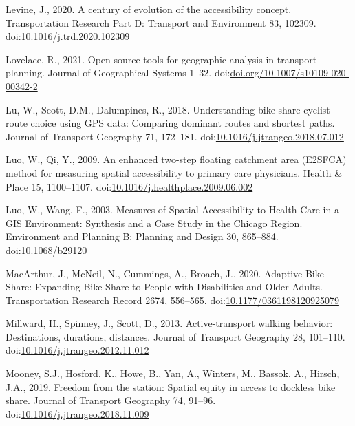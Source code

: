 \documentclass[]{elsarticle} %
\begin{document}
\leavevmode\hypertarget{ref-levineCenturyEvolutionAccessibility2020}{}%
Levine, J., 2020. A century of evolution of the accessibility concept.
Transportation Research Part D: Transport and Environment 83, 102309.
doi:\href{https://doi.org/10.1016/j.trd.2020.102309}{10.1016/j.trd.2020.102309}

\leavevmode\hypertarget{ref-lovelace2021open}{}%
Lovelace, R., 2021. Open source tools for geographic analysis in
transport planning. Journal of Geographical Systems 1--32.
doi:\href{https://doi.org/doi.org/10.1007/s10109-020-00342-2}{doi.org/10.1007/s10109-020-00342-2}

\leavevmode\hypertarget{ref-luUnderstandingBikeShare2018}{}%
Lu, W., Scott, D.M., Dalumpines, R., 2018. Understanding bike share
cyclist route choice using GPS data: Comparing dominant routes and
shortest paths. Journal of Transport Geography 71, 172--181.
doi:\href{https://doi.org/10.1016/j.jtrangeo.2018.07.012}{10.1016/j.jtrangeo.2018.07.012}

\leavevmode\hypertarget{ref-luoEnhancedTwostepFloating2009}{}%
Luo, W., Qi, Y., 2009. An enhanced two-step floating catchment area
(E2SFCA) method for measuring spatial accessibility to primary care
physicians. Health \& Place 15, 1100--1107.
doi:\href{https://doi.org/10.1016/j.healthplace.2009.06.002}{10.1016/j.healthplace.2009.06.002}

\leavevmode\hypertarget{ref-luoMeasuresSpatialAccessibility2003}{}%
Luo, W., Wang, F., 2003. Measures of Spatial Accessibility to Health
Care in a GIS Environment: Synthesis and a Case Study in the Chicago
Region. Environment and Planning B: Planning and Design 30, 865--884.
doi:\href{https://doi.org/10.1068/b29120}{10.1068/b29120}

\leavevmode\hypertarget{ref-macarthurAdaptiveBikeShare2020}{}%
MacArthur, J., McNeil, N., Cummings, A., Broach, J., 2020. Adaptive Bike
Share: Expanding Bike Share to People with Disabilities and Older
Adults. Transportation Research Record 2674, 556--565.
doi:\href{https://doi.org/10.1177/0361198120925079}{10.1177/0361198120925079}

\leavevmode\hypertarget{ref-millwardActivetransportWalkingBehavior2013}{}%
Millward, H., Spinney, J., Scott, D., 2013. Active-transport walking
behavior: Destinations, durations, distances. Journal of Transport
Geography 28, 101--110.
doi:\href{https://doi.org/10.1016/j.jtrangeo.2012.11.012}{10.1016/j.jtrangeo.2012.11.012}

\leavevmode\hypertarget{ref-mooneyFreedomStationSpatial2019}{}%
Mooney, S.J., Hosford, K., Howe, B., Yan, A., Winters, M., Bassok, A.,
Hirsch, J.A., 2019. Freedom from the station: Spatial equity in access
to dockless bike share. Journal of Transport Geography 74, 91--96.
doi:\href{https://doi.org/10.1016/j.jtrangeo.2018.11.009}{10.1016/j.jtrangeo.2018.11.009}
\end{document}
